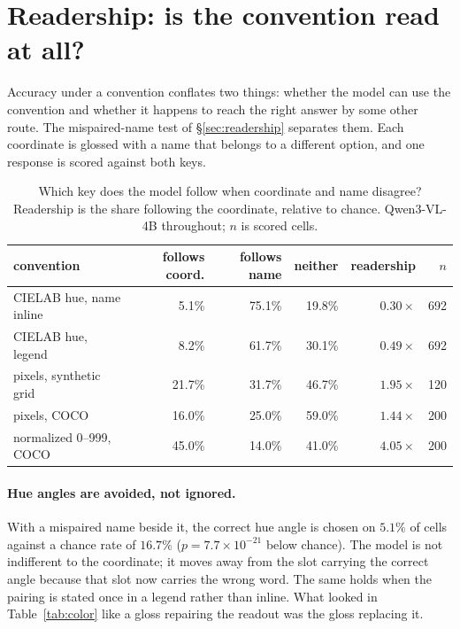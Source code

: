 \documentclass{article}
\begin{document}
\section{Readership: is the convention read at all?}
\label{sec:readout}

Accuracy under a convention conflates two things: whether the model can use the
convention and whether it happens to reach the right answer by some other route.
The mispaired-name test of \S\ref{sec:readership} separates them. Each coordinate
is glossed with a name that belongs to a different option, and one response is
scored against both keys.

\begin{table}[t]
\centering
\caption{Which key does the model follow when coordinate and name disagree?
Readership is the share following the coordinate, relative to chance. Qwen3-VL-4B
throughout; $n$ is scored cells.}
\label{tab:readership}
\begin{tabular}{lrrrrr}
\toprule
convention & follows coord. & follows name & neither & readership & $n$ \\
\midrule
CIELAB hue, name inline   &  5.1\% & 75.1\% & 19.8\% & $0.30\times$ & 692 \\
CIELAB hue, legend        &  8.2\% & 61.7\% & 30.1\% & $0.49\times$ & 692 \\
pixels, synthetic grid    & 21.7\% & 31.7\% & 46.7\% & $1.95\times$ & 120 \\
pixels, COCO              & 16.0\% & 25.0\% & 59.0\% & $1.44\times$ & 200 \\
normalized 0--999, COCO   & 45.0\% & 14.0\% & 41.0\% & $4.05\times$ & 200 \\
\bottomrule
\end{tabular}
\end{table}

\paragraph{Hue angles are avoided, not ignored.} With a mispaired name beside it,
the correct hue angle is chosen on $5.1\%$ of cells against a chance rate of
$16.7\%$ ($p=7.7\times10^{-21}$ below chance). The model is not indifferent to the
coordinate; it moves away from the slot carrying the correct angle because that
slot now carries the wrong word. The same holds when the pairing is stated once in
a legend rather than inline. What looked in Table~\ref{tab:color} like a gloss
repairing the readout was the gloss replacing it.
\end{document}
